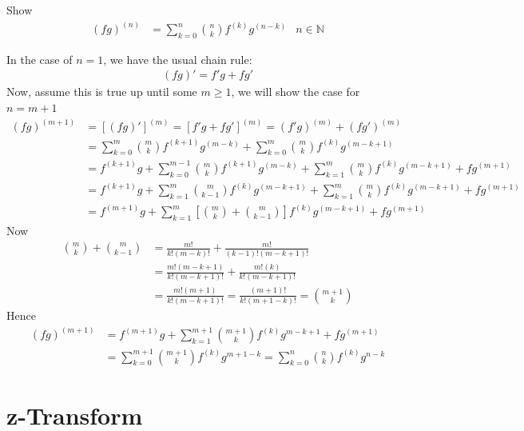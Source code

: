 \documentclass[12pt, english]{book}
\makeatletter
\renewenvironment{proof}[1][\proofname]{\par
	\pushQED{\qed}%
	\normalfont \topsep6\p@\@plus6\p@\relax
	\list{}{%
		\settowidth{\leftmargin}{\itshape\proofname:\hskip\labelsep}%
		\setlength{\labelwidth}{0pt}%
		\setlength{\itemindent}{-\leftmargin}%
	}%
	\item[\hskip\labelsep\itshape#1\@addpunct{:}]\ignorespaces
	}{ \popQED\endlist\@endpefalse}
\makeatother
\begin{document}
	\begin{example}
		\label{Leibniz's Rule Proof - Complex}
		Show
		\begin{align*}
			(fg)^{(n)} &= \sum_{k=0}^{n}\binom{n}{k} f^{(k)} g^{(n-k)} & n \in \mathbb{N}
		\end{align*}
		\begin{proof}
			{\color{Grey}
			In the case of \(n=1\), we have the usual chain rule:
			\begin{align*}
				(fg)' = f'g + fg'
			\end{align*}
			Now, assume this is true up until some \(m \geq 1\), we will show the case for \(n=m+1\)
			\begin{align*}
				(fg)^{(m+1)} 
				&= [(fg)']^{(m)} = [f'g + fg']^{(m)} = (f'g)^{(m)} + (fg')^{(m)} \\
				&= \sum_{k=0}^{m} \binom{m}{k} f^{(k+1)} g^{(m-k)} + \sum_{k=0}^{m} \binom{m}{k} f^{(k)} g^{(m-k+1)} \\
				&= f^{(k+1)}g + \sum_{k=0}^{m-1} \binom{m}{k} f^{(k+1)} g^{(m-k)}
				 + \sum_{k=1}^{m} \binom{m}{k} f^{(k)} g^{(m-k+1)} + fg^{(m+1)} \\
				&= f^{(k+1)}g + \sum_{k=1}^{m} \binom{m}{k-1} f^{(k)} g^{(m-k+1)}
				 + \sum_{k=1}^{m} \binom{m}{k} f^{(k)} g^{(m-k+1)} + fg^{(m+1)} \\
				&= f^{(m+1)} g + \sum_{k=1}^{m} \left[ \binom{m}{k} + \binom{m}{k-1}\right] f^{(k)} g^{(m-k+1)} + fg^{(m+1)}
			\end{align*}
			Now
			\begin{align*}
				\binom{m}{k} + \binom{m}{k-1} 
				&= \frac{m!}{k!(m-k)!} + \frac{m!}{(k-1)!(m-k+1)!}\\
				&= \frac{m!(m-k+1)}{k!(m-k+1)!} + \frac{m!(k)}{k!(m-k+1)!}\\
				&= \frac{m!(m+1)}{k!(m-k+1)!} = \frac{(m+1)!}{k!(m+1-k)!} = \binom{m+1}{k}
			\end{align*}
			Hence
			\begin{align*}
				(fg)^{(m+1)} 
				&= f^{(m+1)}g + \sum_{k=1}^{m+1} \binom{m+1}{k} f^{(k)} g^{m-k+1} + fg^{(m+1)} \\
				&= \sum_{k=0}^{m+1} \binom{m+1}{k} f^{(k)} g^{m+1-k} 
				 = \sum_{k=0}^{n} \binom{n}{k} f^{(k)} g^{n-k} 
			\end{align*}
			}
		\end{proof}
	\end{example}

	\section{z-Transform} \label{z-Transform Section - Complex}
\end{document}
